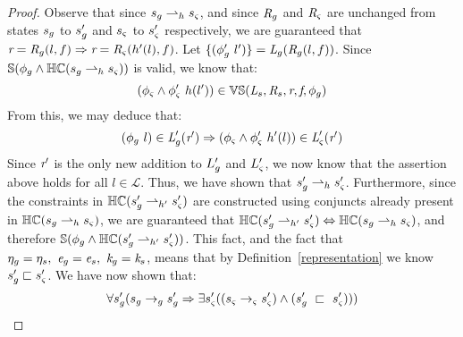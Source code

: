\begin{proof}
Observe that since $s_{g} \rightharpoonup_{h} s_{\varsigma}$, and since $\emph{R}_{g}$ and $\emph{R}_{\varsigma}$ are unchanged from states $s_{g}$ to $s_{g}^\prime$ and $s_{\varsigma}$ to $s_{\varsigma}^\prime$ respectively, we are guaranteed that $ \emph{r} = \emph{R}_{g}(l,f) \Rightarrow \emph{r} = \emph{R}_{\varsigma}(h^\prime(l),f)$. Let $\{(\phi_{g}^\prime\ l^\prime)\} =  \emph{L}_{g}(\emph{R}_{g}(l,f))$. Since $\mathbb{S}(\phi_g \wedge \mathbb{HC}(s_{g} \rightharpoonup_{h} s_{\varsigma}))$ is valid, we know that:
 $$(\phi_{\varsigma} \wedge \phi_{\varsigma}^\prime\ h(l^\prime)) \in \mathbb{VS}( \emph{L}_{s},\emph{R}_{s},\emph{r},\emph{f},\phi_g)$$ 
From this, we may deduce that:
$$ (\phi_{g}\ l) \in \emph{L}_{g}^\prime(\emph{r}^\prime) \Rightarrow (\phi_{\varsigma} \wedge \phi_{\varsigma}^\prime\ h^\prime(l))\in \emph{L}_{\varsigma}^\prime(\emph{r}^\prime)$$
Since $\emph{r}^\prime$ is the only new addition to $L_{g}^\prime$ and $L_{\varsigma}^\prime$, we now know that the assertion above holds for all $l \in \mathcal{L}$. Thus, we have shown that $s_{g}^\prime \rightharpoonup_{h} s_{\varsigma}^\prime$. Furthermore, since the constraints in $\mathbb{HC}(s_{g}^\prime \rightharpoonup_{h^\prime} s_{\varsigma}^\prime)$ are constructed using conjuncts already present in $ \mathbb{HC}(s_{g} \rightharpoonup_{h} s_{\varsigma})$, we are guaranteed that $\mathbb{HC}(s_{g}^\prime \rightharpoonup_{h^\prime} s_{\varsigma}^\prime) \Leftrightarrow \mathbb{HC}(s_{g} \rightharpoonup_{h} s_{\varsigma})$, and therefore $\mathbb{S}(\phi_g \wedge \mathbb{HC}(s_{g}^\prime \rightharpoonup_{h^\prime} s_{\varsigma}^\prime))$. This fact, and the fact that $\eta_{g} = \eta_{s} ,\ \emph{e}_{g} = \emph{e}_{s} ,\ \emph{k}_{g} = \emph{k}_{s}$, means that by Definition~\ref{representation} we know $s_{g}^\prime \sqsubset s_{\varsigma}^\prime$. We have now shown that:
\begin{equation}
\forall s_{g}^\prime ( s_{g} \rightarrow_{g} s_{g}^\prime \Rightarrow \exists s_{\varsigma}^\prime( (s_{\varsigma} \rightarrow_{\varsigma} s_{\varsigma}^\prime )\wedge (s_{g}^\prime\ \sqsubset\ s_{\varsigma}^\prime ))  )
\end{equation}


\end{proof}
